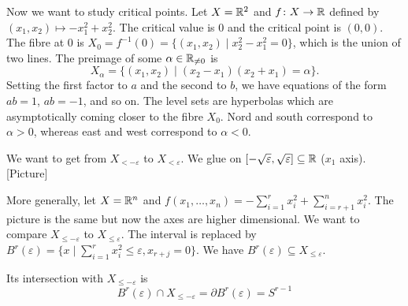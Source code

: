 \documentclass[A4paper, british, reqno]{amsart}
\theoremstyle{darkgreentheorem}
\theoremstyle{darkbluedefinition}
\theoremstyle{darkredexample}
\theoremstyle{remark}
\newcommand{\1}{\mathbbm{1}}
\newcommand{\sub}{\subseteq}
\begin{document}
Now we want to study critical points.
Let $X=\mathbb{R}^{2}$ and $f\colon X\to \mathbb{R}$ defined by $(x_{1},x_{2})\mapsto -x_{1}^{2}+x_{2}^{2}$.
The critical value is $0$ and the critical point is $(0,0)$.
The fibre at $0$ is $X_{0}=f^{-1}(0)=\{(x_{1},x_{2})\mid x_{2}^{2}-x_{1}^{2}=0 \}$, which is the union of two lines.
The preimage of some $\alpha\in \mathbb{R}_{\neq 0}$ is
\[ X_{\alpha}=\{(x_{1},x_{2})\mid (x_{2}-x_{1})(x_{2}+x_{1})=\alpha \}. \]
Setting the first factor to $a$ and the second to $b$, we have equations of the form $ab=1$, $ab=-1$, and so on.
The level sets are hyperbolas which are asymptotically coming closer to the fibre $X_{0}$.
Nord and south correspond to $\alpha>0$, whereas east and west correspond to $\alpha<0$.

We want to get from $X_{<-\varepsilon}$ to $X_{<\varepsilon }$.
We glue on $[-\sqrt{\varepsilon},\sqrt{\varepsilon}]\sub \R$ ($x_{1}$ axis).
[Picture]

More generally, let $X=\mathbb{R}^{n}$ and $f(x_{1},\ldots,x_{n})=-\sum_{i=1}^{r}x_{i}^{2}+\sum_{i=r+1}^{n}x_{i}^{2}$.
The picture is the same but now the axes are higher dimensional.
We want to compare $X_{\leqslant -\varepsilon }$ to $X_{\leqslant \varepsilon}$.
The interval is replaced by $B^{r}(\varepsilon)=\{x\mid \sum_{i=1}^{r}x_{i}^{2}\leqslant \varepsilon, x_{r+j}=0\}$.
We have $B^{r}(\varepsilon)\sub X_{\leqslant \varepsilon}$.

Its intersection with $X_{\leqslant -\varepsilon}$ is
\[ B^{r}(\varepsilon)\cap X_{\leqslant -\varepsilon }=\partial B^{r}(\varepsilon)=S^{r-1} \]
\end{document}
